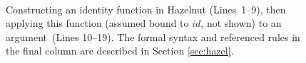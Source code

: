 \begin{figure}[t!]
\[\begin{array}{|c||c|c||l|l|}
\end{array}
\]
\caption{Constructing an identity function in Hazelnut (Lines~1--9), then  applying this function (assumed bound to $id$, not shown) to an argument~(Lines 10--19). The formal syntax and referenced rules in the final column are described in Section \ref{sec:hazel}.}
\label{fig:first-example}
\end{figure}